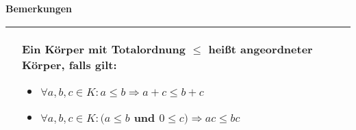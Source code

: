     \noindent
    \textbf{Bemerkungen}
    \begin{table}[H]
    \begin{tabularx}{\textwidth}{X m{16cm}}
        \toprule

            &   Ein Körper mit Totalordnung $\leq$ heißt \textbf{angeordneter Körper}, falls gilt:
                \begin{itemize}[topsep=-0.5cm]
                    \item $\forall a,b,c \in K: a \leq b \Rightarrow a + c \leq b + c$
                    \item $\forall a,b,c \in K: (a \leq b$ und $0 \leq c) \Rightarrow ac \leq bc$
                \end{itemize} \vspace{-0cm} \\

        \bottomrule
    \end{tabularx}
    \end{table}

    \pagebreak

